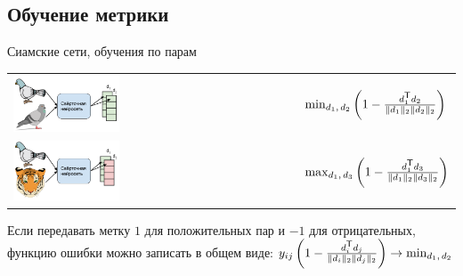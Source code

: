 \subsection{Обучение метрики}

\begin{frame}{Сиамские сети, обучения по парам}
\centering
\begin{tabular}{m{15em} m{10em}}
    \includegraphics[width=0.38\textwidth]{images/siamse pigeon1.png} & 
    $
    \min_{d_1,\,d_2} \left( 1 - \frac{ d_1^{\mathsf{\scriptstyle T}} d_2 }{\|d_1\|_2 \|d_2\|_2} \right)
    $
    \\
    \includegraphics[width=0.38\textwidth]{images/siamse pigeon2.png} & 
    $
    \max_{d_1,\,d_3} \left( 1 - \frac{ d_1^{\mathsf{\scriptstyle T}} d_3 }{\|d_1\|_2 \|d_3\|_2} \right)
    $
    \\
\end{tabular}

Если передавать метку $1$ для положительных пар и $-1$ для отрицательных, функцию ошибки можно записать в общем виде: $y_{ij} \left( 1 - \frac{ d_i^{\mathsf{\scriptstyle T}} d_j }{\|d_i\|_2 \|d_j\|_2} \right) \rightarrow \min_{d_1,\,d_2}$

\end{frame}

